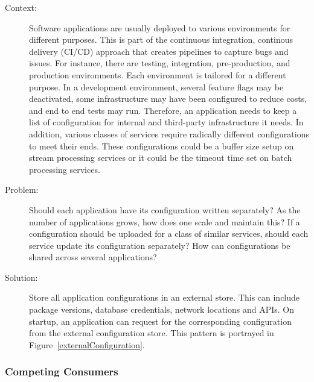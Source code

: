 \documentclass{bmcart}
\begin{document}
\begin{description}
  \item[Context:] Software applications are usually deployed to various environments for different purposes. This is part of the continuous integration, continous delivery (CI/CD) approach that creates pipelines to capture bugs and issues. For instance, there are testing, integration, pre-production, and production environments. Each environment is tailored for a different purpose. In a development environment, several feature flags may be deactivated, some infrastructure may have been configured to reduce costs, and end to end tests may run. Therefore, an application needs to keep a list of configuration for internal and third-party infrastructure it needs. In addition, various classes of services require radically different configurations to meet their ends. These configurations could be a buffer size setup on stream processing services or it could be the timeout time set on batch processing services. 
  \item[Problem:] Should each application have its configuration written separately? As the number of applications grows, how does one scale and maintain this? If a configuration should be uploaded for a class of similar services, should each service update its configuration separately? How can configurations be shared across several applications? 
  \item[Solution:] Store all application configurations in an external store. This can include package versions, database credentials, network locations and APIs. On startup, an application can request for the corresponding configuration from the external configuration store. This pattern is portrayed in Figure~\ref{externalConfiguration}.
\end{description}


\subsubsection{Competing Consumers}
\end{document}
